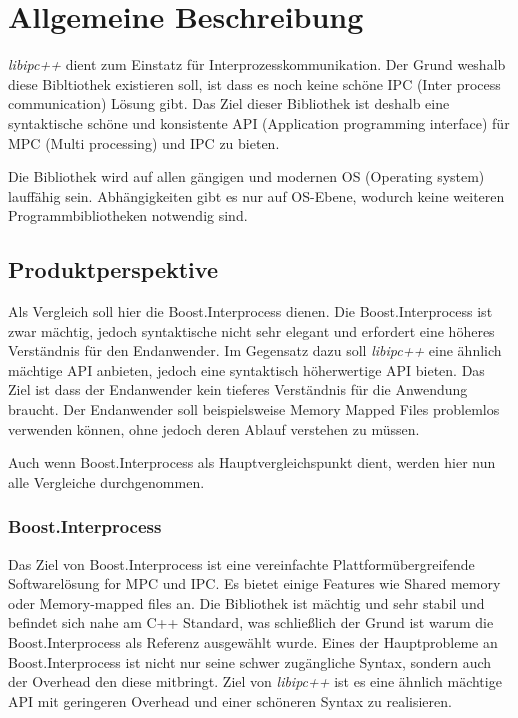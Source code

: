 \documentclass[a4paper]{book}
\begin{document}
\chapter{Allgemeine Beschreibung}
\textit{libipc++} dient zum Einstatz für Interprozesskommunikation. Der Grund weshalb diese Bibltiothek existieren soll, ist dass es noch keine schöne IPC (Inter process communication) Lösung gibt. Das Ziel dieser Bibliothek ist deshalb eine syntaktische schöne und konsistente API (Application programming interface) für MPC (Multi processing) und IPC zu bieten.\newline

\noindent Die Bibliothek wird auf allen gängigen und modernen OS (Operating system) lauffähig sein. Abhängigkeiten gibt es nur auf OS-Ebene, wodurch keine weiteren Programmbibliotheken notwendig sind.

\section{Produktperspektive}
Als Vergleich soll hier die Boost.Interprocess dienen. Die Boost.Interprocess ist zwar mächtig, jedoch syntaktische nicht sehr elegant und erfordert eine höheres Verständnis für den Endanwender. Im Gegensatz dazu soll \textit{libipc++} eine ähnlich mächtige API anbieten, jedoch eine syntaktisch höherwertige API bieten. Das Ziel ist dass der Endanwender kein tieferes Verständnis für die Anwendung braucht. Der Endanwender soll beispielsweise Memory Mapped Files problemlos verwenden können, ohne jedoch deren Ablauf verstehen zu müssen.\newline

\noindent Auch wenn Boost.Interprocess als Hauptvergleichspunkt dient, werden hier nun alle Vergleiche durchgenommen.

\subsection{Boost.Interprocess}
Das Ziel von Boost.Interprocess ist eine vereinfachte Plattformübergreifende Softwarelösung for MPC und IPC. Es bietet einige Features wie Shared memory oder Memory-mapped files an. Die Bibliothek ist mächtig und sehr stabil und befindet sich nahe am C++ Standard, was schließlich der Grund ist warum die Boost.Interprocess als Referenz ausgewählt wurde.
Eines der Hauptprobleme an Boost.Interprocess ist nicht nur seine schwer zugängliche Syntax, sondern auch der Overhead den diese mitbringt. Ziel von \textit{libipc++} ist es eine ähnlich mächtige API mit geringeren Overhead und einer schöneren Syntax zu realisieren.
\end{document}
